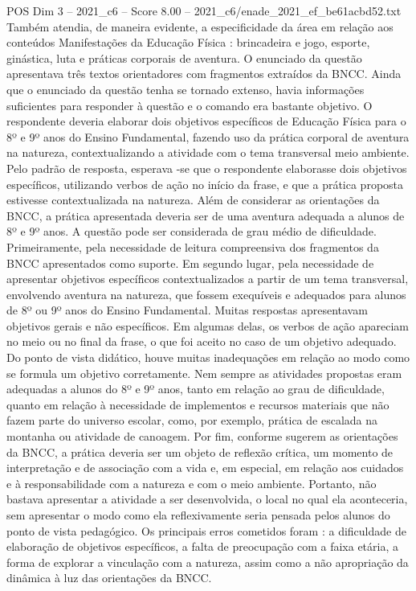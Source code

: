 \begin{textsample}{POS Dim 3 – 2021\_c6 – Score 8.00 – 2021\_c6/enade\_2021\_ef\_be61acbd52.txt}
Também atendia, de maneira evidente, a especificidade da área em relação aos conteúdos Manifestações da Educação Física : brincadeira e jogo, esporte, ginástica, luta e práticas corporais de aventura.
O enunciado da questão apresentava três textos orientadores com fragmentos extraídos da BNCC.
Ainda que o enunciado da questão tenha se tornado extenso, havia informações suficientes para responder à questão e o comando era bastante objetivo.
O respondente deveria elaborar dois objetivos específicos de Educação Física para o 8º e 9º anos do Ensino Fundamental, fazendo uso da prática corporal de aventura na natureza, contextualizando a atividade com o tema transversal meio ambiente.
Pelo padrão de resposta, esperava -se que o respondente elaborasse dois objetivos específicos, utilizando verbos de ação no início da frase, e que a prática proposta estivesse contextualizada na natureza.
Além de considerar as orientações da BNCC, a prática apresentada deveria ser de uma aventura adequada a alunos de 8º e 9º anos.
A questão pode ser considerada de grau médio de dificuldade.
Primeiramente, pela necessidade de leitura compreensiva dos fragmentos da BNCC apresentados como suporte.
Em segundo lugar, pela necessidade de apresentar objetivos específicos contextualizados a partir de um tema transversal, envolvendo aventura na natureza, que fossem exequíveis e adequados para alunos de 8º ou 9º anos do Ensino Fundamental.
Muitas respostas apresentavam objetivos gerais e não específicos.
Em algumas delas, os verbos de ação apareciam no meio ou no final da frase, o que foi aceito no caso de um objetivo adequado.
Do ponto de vista didático, houve muitas inadequações em relação ao modo como se formula um objetivo corretamente.
Nem sempre as atividades propostas eram adequadas a alunos do 8º e 9º anos, tanto em relação ao grau de dificuldade, quanto em relação à necessidade de implementos e recursos materiais que não fazem parte do universo escolar, como, por exemplo, prática de escalada na montanha ou atividade de canoagem.
Por fim, conforme sugerem as orientações da BNCC, a prática deveria ser um objeto de reflexão crítica, um momento de interpretação e de associação com a vida e, em especial, em relação aos cuidados e à responsabilidade com a natureza e com o meio ambiente.
Portanto, não bastava apresentar a atividade a ser desenvolvida, o local no qual ela aconteceria, sem apresentar o modo como ela reflexivamente seria pensada pelos alunos do ponto de vista pedagógico.
Os principais erros cometidos foram : a dificuldade de elaboração de objetivos específicos, a falta de preocupação com a faixa etária, a forma de explorar a vinculação com a natureza, assim como a não apropriação da dinâmica à luz das orientações da BNCC.

\end{textsample}
